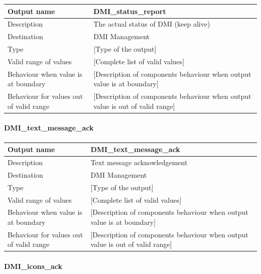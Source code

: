 \begin{longtable}{p{}p{}}
\toprule
Output name				& DMI\_status\_report \\
\midrule
Description				& The actual status of DMI (keep alive) \\
\midrule
Destination				& DMI Management \\ 
\midrule
Type					& [Type of the output] \\
\midrule
Valid range of values	& [Complete list of valid values] \\
\midrule
Behaviour when value is at boundary	& [Description of components behaviour when output value is at boundary] \\
\midrule
Behaviour for values out of valid range	& [Description of components behaviour when output value is out of valid range] \\
\bottomrule
\end{longtable}


\paragraph{DMI\_text\_message\_ack}

\begin{longtable}{p{}p{}}
\toprule
Output name				& DMI\_text\_message\_ack \\
\midrule
Description				& Text message acknowledgement \\
\midrule
Destination				& DMI Management \\ 
\midrule
Type					& [Type of the output] \\
\midrule
Valid range of values	& [Complete list of valid values] \\
\midrule
Behaviour when value is at boundary	& [Description of components behaviour when output value is at boundary] \\
\midrule
Behaviour for values out of valid range	& [Description of components behaviour when output value is out of valid range] \\
\bottomrule
\end{longtable}


\paragraph{DMI\_icons\_ack}

